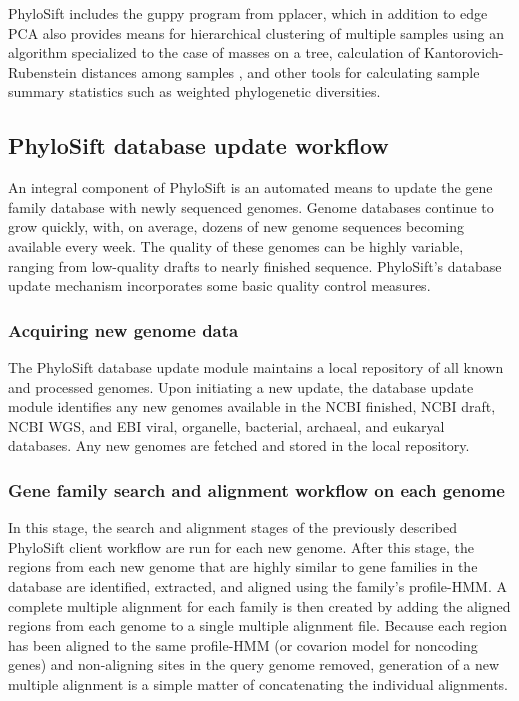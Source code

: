 \documentclass[10pt]{article}
\begin{document}
PhyloSift includes the guppy program from pplacer, which in addition to edge PCA also provides means for hierarchical clustering of multiple samples using an algorithm specialized to the case of masses on a tree, calculation of Kantorovich-Rubenstein distances among samples \cite{Evans2010}, and other tools for calculating sample summary statistics such as weighted phylogenetic diversities.

\subsection*{PhyloSift database update workflow}\label{sec:dbupdate}
An integral component of PhyloSift is an automated means to update the gene family database with newly sequenced genomes.
Genome databases continue to grow quickly, with, on average, dozens of new genome sequences becoming available every week.
The quality of these genomes can be highly variable, ranging from low-quality drafts to nearly finished sequence.
PhyloSift's database update mechanism incorporates some basic quality control measures.
\subsubsection*{Acquiring new genome data}
The PhyloSift database update module maintains a local repository of all known and processed genomes.
Upon initiating a new update, the database update module identifies any new genomes available in the NCBI finished, NCBI draft, NCBI WGS, and EBI viral, organelle, bacterial, archaeal, and eukaryal databases.
Any new genomes are fetched and stored in the local repository.
\subsubsection*{Gene family search and alignment workflow on each genome}
In this stage, the search and alignment stages of the previously described PhyloSift client workflow are run for each new genome.
After this stage, the regions from each new genome that are highly similar to gene families in the database are identified, extracted, and aligned using the family's profile-HMM.
A complete multiple alignment for each family is then created by adding the aligned regions from each genome to a single multiple alignment file.
Because each region has been aligned to the same profile-HMM (or covarion model for noncoding genes) and non-aligning sites in the query genome removed, generation of a new multiple alignment is a simple matter of concatenating the individual alignments.
\end{document}

